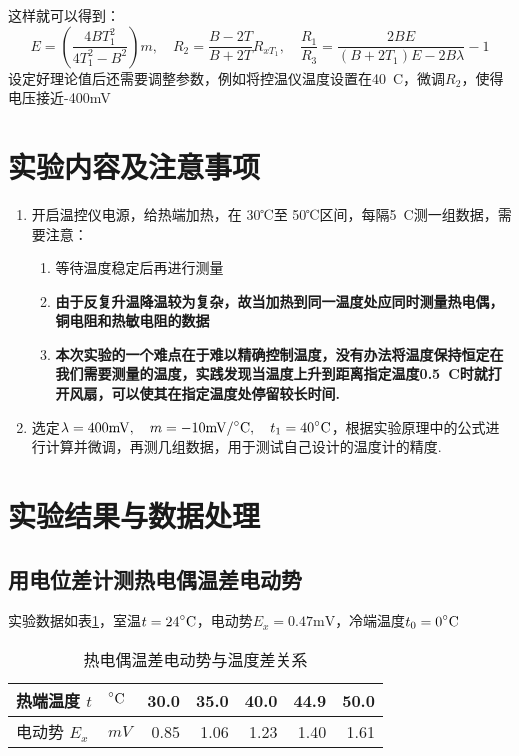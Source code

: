 \documentclass[11pt]{article}
\newcommand*{\mcelsius}{\unit{\prescript{\circ}{}C}}
\begin{document}
这样就可以得到：\begin{displaymath}E=\left(\frac{4BT_1^2}{4T_1^2-B^2}\right)m,\quad R_2=\frac{B-2T}{B+2T}R_{xT_1},\quad \frac{R_1}{R_3}=\frac{2BE}{(B+2T_1)E-2B\lambda}-1\end{displaymath}
设定好理论值后还需要调整参数，例如将控温仪温度设置在40\mcelsius，微调$R_2$，使得电压接近-400mV






\section{实验内容及注意事项}

\begin{enumerate}
	\item 开启温控仪电源，给热端加热，在 30℃至 50℃区间，每隔5\mcelsius 测一组数据，需要注意：
	
	\begin{enumerate}
		\item 等待温度稳定后再进行测量
		\item \textbf{由于反复升温降温较为复杂，故当加热到同一温度处应同时测量热电偶，铜电阻和热敏电阻的数据}
		\item \textbf{本次实验的一个难点在于难以精确控制温度，没有办法将温度保持恒定在我们需要测量的温度，实践发现当温度上升到距离指定温度0.5\mcelsius 时就打开风扇，可以使其在指定温度处停留较长时间.}
	\end{enumerate}
	\item 选定$\lambda=400\mathrm{mV},\quad m=-10\mathrm{mV/\mcelsius},\quad t_1=40\mcelsius$，根据实验原理中的公式进行计算并微调，再测几组数据，用于测试自己设计的温度计的精度.
\end{enumerate}





\section{实验结果与数据处理}
	
	\subsection{用电位差计测热电偶温差电动势}
	
	实验数据如表\ref{tab:热电偶}，室温$t=24\mcelsius$，电动势$E_x=0.47\mathrm{mV}$，冷端温度$t_0=0\mcelsius$
	\begin{table}[htbp]
		\centering
		\caption{热电偶温差电动势与温度差关系}
		\begin{tabular}{|l|l|r|r|r|r|r|}
			\hline
			热端温度 $t$   & $\mcelsius$  & 30.0    & 35.0    & 40.0    & 44.9    & 50.0  \bigstrut\\
			\hline
			电动势 $E_x$   & $\unit{mV}$ & 0.85   & 1.06   & 1.23   & 1.40   & 1.61  \bigstrut\\
			\hline
		\end{tabular}%
		\label{tab:热电偶}%
	\end{table}%
	
\end{document}
